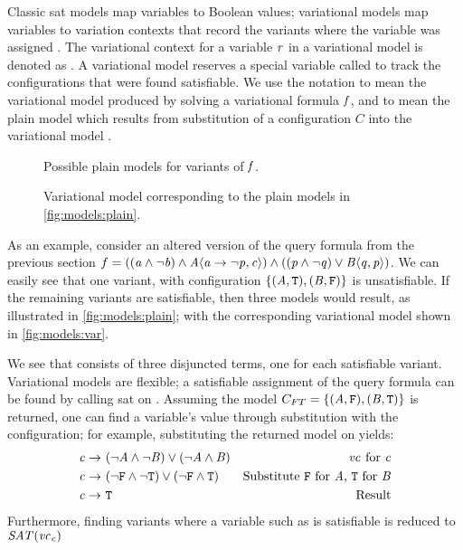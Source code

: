 \label{section:vsat:models}
%
Classic \ac{sat} models map variables to Boolean values; variational models map
variables to variation contexts that record the variants where the variable was
assigned \tru{}. The variational context for a variable $\mathit{r}$ in a
variational model is denoted as . A variational model reserves a special
variable called \SatVar{} to track the configurations that were found
satisfiable. We use the notation  to mean the variational model
produced by solving a variational formula $\mathit{f}$, and  to mean
the plain model which results from substitution of a configuration $C$ into the
variational model .
%
\begin{figure}[h]
  \centering
  
  \caption{Possible plain models for variants of $\mathit{f}$.}%
  \label{fig:models:plain}
\end{figure}
\begin{figure}[h]
  \centering
  
  \caption{Variational model corresponding to the plain models in
    \autoref{fig:models:plain}.}%
  \label{fig:models:var}
\end{figure}
%
As an example, consider an altered version of the query formula from the
previous section $f = ((\aV{} \wedge \neg \bV{}) \wedge \chc[A]{\aV{}
  \rightarrow \neg \pV{}, \cV{}}) \wedge ((\pV{} \wedge \neg \qV{}) \vee
\chc[B]{\qV{}, \pV{}})$. We can easily see that one variant, with configuration
$\{(\mathit{A}{},\texttt{T}{}), (\mathit{B}{},\texttt{F}{})\}$ is unsatisfiable. If the remaining variants
are satisfiable, then three models would result, as illustrated in
\autoref{fig:models:plain}; with the corresponding variational model shown in
\autoref{fig:models:var}.

We see that \Satvc{} consists of three disjuncted terms, one for each
satisfiable variant. Variational models are flexible; a satisfiable assignment
of the query formula can be found by calling \ac{sat} on \Satvc{}. Assuming the
model $C_{FT} = \{(\mathit{A}{}, \texttt{F}{}), (\mathit{B}{}, \texttt{T}{})\}$ is returned, one can find
a variable's value through substitution with the configuration; for example,
substituting the returned model on  yields:
%
\begin{align*}
  \mathit{c}{} \rightarrow\ & (\neg \mathit{A}{} \wedge \neg \mathit{B}{}) \vee (\neg \mathit{A}{} \wedge \mathit{B}{}) & \text{\ensuremath{\mathit{vc}_{}} for \ensuremath{\mathit{c}}{}} \\
  \mathit{c}{} \rightarrow\ & (\neg \texttt{F}{} \wedge \neg \texttt{T}{}) \vee (\neg \texttt{F}{} \wedge \texttt{T}{}) & \text{Substitute \texttt{F}{} for \ensuremath{\mathit{A}}{}, \texttt{T}{} for \ensuremath{\mathit{B}}{}} \\
  \mathit{c}{} \rightarrow\ & \texttt{T}{} & \text{Result}
\end{align*}%
%
Furthermore, finding variants where a variable such as \cV{} is satisfiable is
reduced to $\mathit{SAT(\mathit{vc}_{\mathit{c}{}})}$

